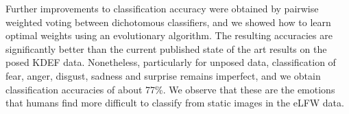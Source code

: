 Further improvements to classification accuracy were obtained by pairwise weighted voting between dichotomous classifiers, and we showed how to learn optimal weights using an evolutionary algorithm.  The resulting accuracies are significantly better than the current published state of the art results on the posed KDEF data. Nonetheless, particularly for unposed data, classification of fear, anger, disgust, sadness and surprise remains imperfect, and we obtain classification accuracies of about 77\%. We observe that these are the emotions that humans find more difficult to classify from static images in the eLFW data.  
